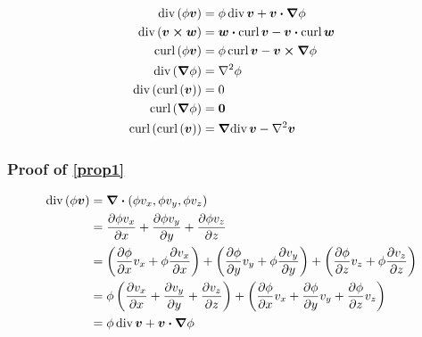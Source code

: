 \documentclass{article}
\renewcommand{\vec}[1]{\boldsymbol{#1}}
\begin{document}
\begin{align}
    \text{div} \left( \phi \vec{v} \right) &= \phi \, \text{div} \, \vec{v} + \vec{v} \vdot \grad{\phi} \label{prop1} \\
    \text{div} \left( \vec{v} \cross \vec{w} \right) &= \vec{w} \vdot \text{curl} \, \vec{v} - \vec{v} \vdot \text{curl} \, \vec{w} \label{prop2} \\
    \text{curl}\left(\phi \vec{v}\right) &= \phi \, \text{curl} \, \vec{v}  - \vec{v} \cross \grad{\phi} \label{prop3} \\
    \text{div} \left( \grad{\phi} \right) &= \laplacian{\phi} \label{prop4} \\
    \text{div} \left( \text{curl}\left(\vec{v}\right) \right) &= 0 \label{prop5} \\
    \text{curl}\left(\grad{\phi}\right) &= \vec{0} \label{prop6} \\
    \text{curl}\left(\text{curl}\left(\vec{v}\right)\right) &= \grad{\text{div} \, \vec{v}} - \laplacian{\vec{v}} \label{prop7}
\end{align}

\subsubsection{Proof of \eqref{prop1}}

\begin{align*}
    \text{div} \left( \phi \vec{v} \right) &= \div \left( \phi v_x , \phi v_y , \phi v_z \right) \\
    &= \frac{\partial{ \phi v_x }}{\partial{ x }} + \frac{\partial{ \phi v_y }}{\partial{ y }} + \frac{\partial{ \phi v_z }}{\partial{ z }} \\
    &= \left( \frac{\partial{ \phi }}{\partial{ x }} v_x + \phi \frac{\partial{ v_x }}{\partial{ x }} \right) + \left( \frac{\partial{ \phi }}{\partial{ y }} v_y + \phi \frac{\partial{ v_y }}{\partial{ y }} \right) + \left( \frac{\partial{ \phi }}{\partial{ z }} v_z + \phi \frac{\partial{ v_z }}{\partial{ z }} \right) \\
    &= \phi \left( \frac{\partial{ v_x }}{\partial{ x }} + \frac{\partial{ v_y }}{\partial{ y }} + \frac{\partial{ v_z }}{\partial{ z }} \right) + \left( \frac{\partial{ \phi }}{\partial{ x }} v_x + \frac{\partial{ \phi }}{\partial{ y }} v_y + \frac{\partial{ \phi }}{\partial{ z }} v_z \right) \\
    &= \phi \, \text{div} \, \vec{v} + \vec{v} \vdot \grad{\phi}
\end{align*}
\end{document}
